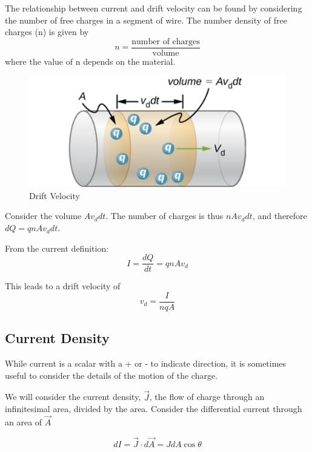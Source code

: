 \documentclass[14pt]{memoir}
\begin{document}
The relationship between current and drift velocity can be found by considering the number of free charges in a segment of wire. The number density of free charges (n) is given by
\begin{equation}
n = \frac{\text{number of charges}}{\text{volume}}
\end{equation}
where the value of n depends on the material. 

\begin{figure}[H]
\begin{center}
\includegraphics[scale=0.50]{fig/fig_09_10.jpg}
\caption{Drift Velocity}
\label{fig:09_10}
\end{center}
\end{figure}

Consider the volume $A v_d dt$. The number of charges is thus $n A v_d dt$, and therefore $dQ = q n A v_d dt$.

From the current definition: 
\begin{equation}
I = \frac{dQ}{dt} = q n A v_d
\end{equation}

This leads to a drift velocity of
\begin{equation}
v_d = \frac{I}{nqA}
\end{equation}


\subsection{Current Density}

While current is a scalar with a + or - to indicate direction, it is sometimes useful to consider the details of the motion of the charge. 

We will consider the current density, $\vec{J}$, the flow of charge through an infinitesimal area, divided by the area. Consider the differential current through an area of $\vec{A}$

\begin{equation}
dI = \vec{J} \cdot d\vec{A} = J dA \cos{\theta}
\end{equation}
\end{document}
